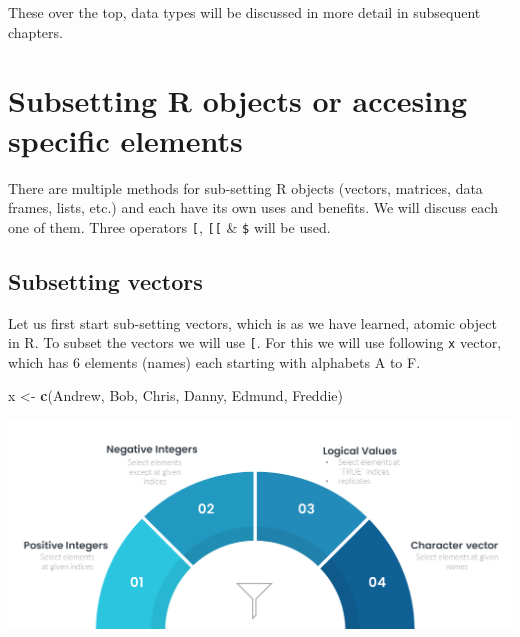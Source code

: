 \documentclass[
]{book}
\newenvironment{Shaded}{\begin{snugshade}}{\end{snugshade}}
\newcommand{\FunctionTok}[1]{\textcolor[rgb]{0.13,0.29,0.53}{\textbf{#1}}}
\newcommand{\NormalTok}[1]{#1}
\newcommand{\OtherTok}[1]{\textcolor[rgb]{0.56,0.35,0.01}{#1}}
\newcommand{\StringTok}[1]{\textcolor[rgb]{0.31,0.60,0.02}{#1}}
\begin{document}
These over the top, data types will be discussed in more detail in subsequent chapters.

\hypertarget{subset}{%
\chapter{Subsetting R objects or accesing specific elements}\label{subset}}

There are multiple methods for sub-setting R objects (vectors, matrices, data frames, lists, etc.) and each have its own uses and benefits. We will discuss each one of them. Three operators \texttt{{[}}, \texttt{{[}{[}} \& \texttt{\$} will be used.

\hypertarget{subsetting-vectors}{%
\section{Subsetting vectors}\label{subsetting-vectors}}

Let us first start sub-setting vectors, which is as we have learned, atomic object in R. To subset the vectors we will use \texttt{{[}}.
For this we will use following \texttt{x} vector, which has 6 elements (names) each starting with alphabets A to F.

\begin{Shaded}
\begin{Highlighting}[]
\NormalTok{x }\OtherTok{\textless{}{-}} \FunctionTok{c}\NormalTok{(}\StringTok{\textquotesingle{}Andrew\textquotesingle{}}\NormalTok{, }\StringTok{\textquotesingle{}Bob\textquotesingle{}}\NormalTok{, }\StringTok{\textquotesingle{}Chris\textquotesingle{}}\NormalTok{, }\StringTok{\textquotesingle{}Danny\textquotesingle{}}\NormalTok{, }\StringTok{\textquotesingle{}Edmund\textquotesingle{}}\NormalTok{, }\StringTok{\textquotesingle{}Freddie\textquotesingle{}}\NormalTok{)}
\end{Highlighting}
\end{Shaded}

\includegraphics{images/subset_vec.png}
\end{document}
